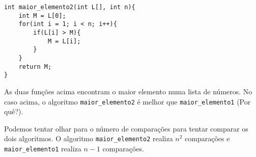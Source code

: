 \documentclass[a4paper,11pt]{article}
\begin{document}
\begin{verbatim}
int maior_elemento2(int L[], int n){
    int M = L[0];
    for(int i = 1; i < n; i++){
        if(L[i] > M){
            M = L[i];
        }
    }
    return M;
}

\end{verbatim}

As duas funções acima encontram o maior elemento numa lista de números. No caso acima, o algoritmo \texttt{maior\_elemento2} é melhor que \texttt{maior\_elemento1} (Por quê?). 

Podemos tentar olhar para o número de comparações para tentar comparar os dois algoritmos. O algoritmo 
\texttt{maior\_elemento2} realiza $n^2$ comparações e 
\texttt{maior\_elemento1} realiza $n-1$ comparações.

\newpage 







	
	
	
\end{document}
